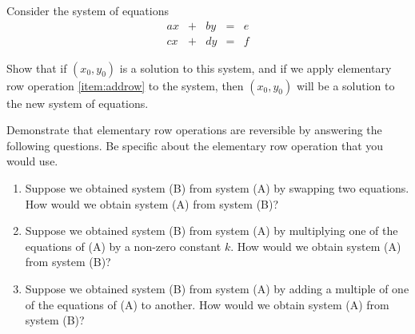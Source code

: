 \documentclass{ximera}
\begin{document}
\begin{problem}\label{prob:equivsystems1}
Consider the system of equations
$$\begin{array}{ccccc}
      ax &+ &by&= &e\\
      cx&+ &dy&=&f      
    \end{array}$$

Show that  if  $(x_0,y_0)$ is a solution to this system, and if we apply elementary row operation \ref{item:addrow} to the system, then $(x_0,y_0)$ will be a solution to the new system of equations.
\end{problem}




 \begin{problem}\label{prob:elemrowopsreverse}
 Demonstrate that elementary row operations are reversible by answering the following questions.  Be specific about the elementary row operation that you would use.
\begin{enumerate}
 \item Suppose we obtained system (B) from system (A) by swapping two equations. How would we obtain system (A) from system (B)?
 \item Suppose we obtained system (B) from system (A) by multiplying one of the equations of (A) by a non-zero constant $k$.  How would we obtain system (A) from system (B)?
 \item Suppose we obtained system (B) from system (A) by adding a multiple of one of the equations of (A) to  another.  How would we obtain system (A) from system (B)?
 \end{enumerate}
 \end{problem}
\end{document}
